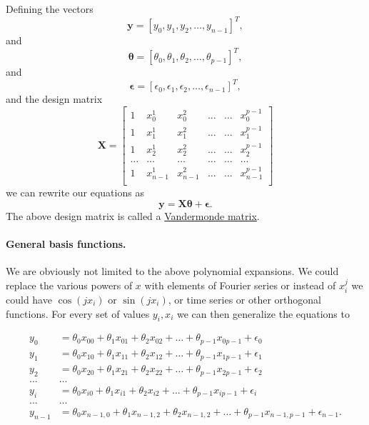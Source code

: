 \documentclass[%
oneside,                 %
final,                   %
10pt]{article}
\newenvironment{block_mdfboxadmon}[1][]{
\begin{block_mdfboxmdframed}[frametitle=#1]
}
{
\end{block_mdfboxmdframed}
}
\begin{document}

\begin{block_mdfboxadmon}[]
Defining the vectors
\[
\bm{y} = [y_0,y_1, y_2,\dots, y_{n-1}]^T,
\]
and
\[
\bm{\theta} = [\theta_0,\theta_1, \theta_2,\dots, \theta_{p-1}]^T,
\]
and
\[
\bm{\epsilon} = [\epsilon_0,\epsilon_1, \epsilon_2,\dots, \epsilon_{n-1}]^T,
\]
and the design matrix
\[
\bm{X}=
\begin{bmatrix} 
1& x_{0}^1 &x_{0}^2& \dots & \dots &x_{0}^{p-1}\\
1& x_{1}^1 &x_{1}^2& \dots & \dots &x_{1}^{p-1}\\
1& x_{2}^1 &x_{2}^2& \dots & \dots &x_{2}^{p-1}\\                      
\dots& \dots &\dots& \dots & \dots &\dots\\
1& x_{n-1}^1 &x_{n-1}^2& \dots & \dots &x_{n-1}^{p-1}\\
\end{bmatrix} 
\]
we can rewrite our equations as
\[
\bm{y} = \bm{X}\bm{\theta}+\bm{\epsilon}.
\]
The above design matrix is called a \href{{https://en.wikipedia.org/wiki/Vandermonde_matrix}}{Vandermonde matrix}.
\end{block_mdfboxadmon} %




\paragraph{General basis functions.}

\begin{block_mdfboxadmon}[]

We are obviously not limited to the above polynomial expansions.  We
could replace the various powers of $x$ with elements of Fourier
series or instead of $x_i^j$ we could have $\cos{(j x_i)}$ or $\sin{(j
x_i)}$, or time series or other orthogonal functions.  For every set
of values $y_i,x_i$ we can then generalize the equations to

\begin{align*}
y_0&=\theta_0x_{00}+\theta_1x_{01}+\theta_2x_{02}+\dots+\theta_{p-1}x_{0p-1}+\epsilon_0\\
y_1&=\theta_0x_{10}+\theta_1x_{11}+\theta_2x_{12}+\dots+\theta_{p-1}x_{1p-1}+\epsilon_1\\
y_2&=\theta_0x_{20}+\theta_1x_{21}+\theta_2x_{22}+\dots+\theta_{p-1}x_{2p-1}+\epsilon_2\\
\dots & \dots \\
y_{i}&=\theta_0x_{i0}+\theta_1x_{i1}+\theta_2x_{i2}+\dots+\theta_{p-1}x_{ip-1}+\epsilon_i\\
\dots & \dots \\
y_{n-1}&=\theta_0x_{n-1,0}+\theta_1x_{n-1,2}+\theta_2x_{n-1,2}+\dots+\theta_{p-1}x_{n-1,p-1}+\epsilon_{n-1}.\\
\end{align*}
\end{block_mdfboxadmon} %
\end{document}
